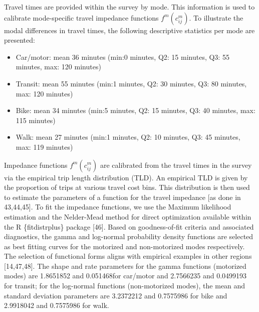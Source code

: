 \documentclass[10pt,letterpaper]{article}
\providecommand{\tightlist}{%
  \setlength{\itemsep}{0pt}\setlength{\parskip}{0pt}}
\begin{document}
Travel times are provided within the survey by mode. This information is
used to calibrate mode-specific travel impedance functions
\(f^m(c_{ij}^m)\). To illustrate the modal differences in travel times,
the following descriptive statistics per mode are presented:

\begin{itemize}
\tightlist
\item
  Car/motor: mean 36 minutes (min:0 minutes, Q2: 15 minutes, Q3: 55
  minutes, max: 120 minutes)
\item
  Transit: mean 55 minutes (min:1 minutes, Q2: 30 minutes, Q3: 80
  minutes, max: 120 minutes)
\item
  Bike: mean 34 minutes (min:5 minutes, Q2: 15 minutes, Q3: 40 minutes,
  max: 115 minutes)
\item
  Walk: mean 27 minutes (min:1 minutes, Q2: 10 minutes, Q3: 45 minutes,
  max: 119 minutes)
\end{itemize}

Impedance functions \(f^m(c_{ij}^m)\) are calibrated from the travel
times in the survey via the empirical trip length distribution (TLD). An
empirical TLD is given by the proportion of trips at various travel cost
bins. This distribution is then used to estimate the parameters of a
function for the travel impedance {[}as done in 43,44,45{]}. To fit the
impedance functions, we use the Maximum likelihood estimation and the
Nelder-Mead method for direct optimization available within the R
\{fitdistrplus\} package {[}46{]}. Based on goodness-of-fit criteria and
associated diagnostics, the gamma and log-normal probability density
functions are selected as best fitting curves for the motorized and
non-motorized modes respectively. The selection of functional forms
aligns with empirical examples in other regions {[}14,47,48{]}. The
shape and rate parameters for the gamma functions (motorized modes) are
1.8651852 and 0.051468for car/motor and 2.7566235 and 0.0499193 for
transit; for the log-normal functions (non-motorized modes), the mean
and standard deviation parameters are 3.2372212 and 0.7575986 for bike
and 2.9918042 and 0.7575986 for walk.
\end{document}
